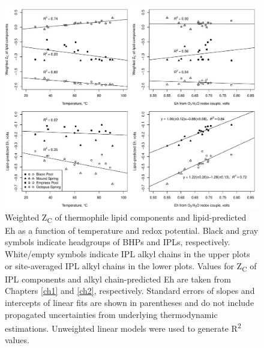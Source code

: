 \singlespace
\begin{figure}[h]
\centering
\includegraphics[width=1\linewidth]{figs_ch3/ZC_Eh_fourpanel.pdf}
\caption[Weighted Z\textsubscript{C} of thermophile lipid components and lipid-predicted Eh as a function of temperature and redox potential]{Weighted Z\textsubscript{C} of thermophile lipid components and lipid-predicted Eh as a function of temperature and redox potential. Black and gray symbols indicate headgroups of BHPs and IPLs, respectively. White/empty symbols indicate IPL alkyl chains in the upper plots or site-averaged IPL alkyl chains in the lower plots. Values for Z\textsubscript{C} of IPL components and alkyl chain-predicted Eh are taken from Chapters \ref{ch1} and \ref{ch2}, respectively. Standard errors of slopes and intercepts of linear fits are shown in parentheses and do not include propagated uncertainties from underlying thermodynamic estimations. Unweighted linear models were used to generate R\textsuperscript{2} values.}
\label{fig:BHP_ZC_Eh_fourpanel}
\end{figure}
\doublespace